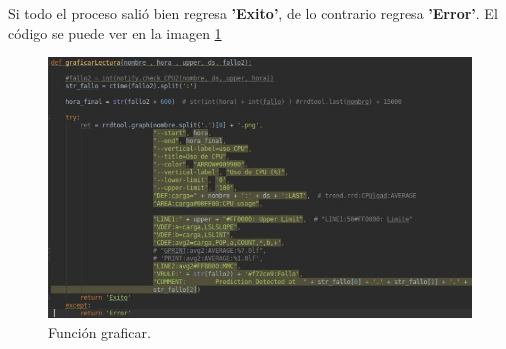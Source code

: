 \begin{itemize}
Si todo el proceso salió bien regresa \textbf{'Exito'}, de lo contrario regresa \textbf{'Error'}.
El código se puede ver en la imagen \ref{image:op1} 

\FloatBarrier
\begin{figure}[htbp!]
		\centering
		    \includegraphics[width=.9 \textwidth]{../images/op1.jpeg} 
		\caption{Función graficar.}
		\label{image:op1}
\end{figure}
\FloatBarrier

\end{itemize}